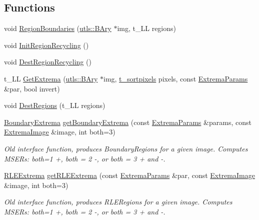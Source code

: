 \subsection*{Functions}
\begin{CompactItemize}
\item 
void \hyperlink{namespaceextrema_a95ae7aa3f47be9a16b8c0c503fd7e79}{Region\-Boundaries} (\hyperlink{structutls_1_1Ary}{utls::BAry} $\ast$img, t\_\-LL regions)
\item 
void \hyperlink{namespaceextrema_8325736376fa1836b6819f542de6274a}{Init\-Region\-Recycling} ()
\item 
void \hyperlink{namespaceextrema_2ebf6ba956eabc1f5c60cddf60af40ef}{Dest\-Region\-Recycling} ()
\item 
t\_\-LL \hyperlink{namespaceextrema_6fa06d87bc447f8bb199c9ad11bb1448}{Get\-Extrema} (\hyperlink{structutls_1_1Ary}{utls::BAry} $\ast$img, \hyperlink{structextrema_1_1s__sortpixels}{t\_\-sortpixels} pixels, const \hyperlink{structextrema_1_1ExtremaParams}{Extrema\-Params} \&par, bool invert)
\item 
void \hyperlink{namespaceextrema_1ddc04cbc97430b6127e80eba26a0fb0}{Dest\-Regions} (t\_\-LL regions)
\item 
\hyperlink{structextrema_1_1BoundaryExtrema}{Boundary\-Extrema} \hyperlink{namespaceextrema_6287a927a289e58f10e7cf51a2420839}{get\-Boundary\-Extrema} (const \hyperlink{structextrema_1_1ExtremaParams}{Extrema\-Params} \&params, const \hyperlink{structextrema_1_1ExtremaImage}{Extrema\-Image} \&image, int both=3)
\begin{CompactList}\small\item\em Old interface function, produces Boundary\-Regions for a given image. Computes MSERs: both=1 +, both = 2 -, or both = 3 + and -. \item\end{CompactList}\item 
\hyperlink{structextrema_1_1RLEExtrema}{RLEExtrema} \hyperlink{namespaceextrema_6898d264cefada5cdda1486f1b58b97e}{get\-RLEExtrema} (const \hyperlink{structextrema_1_1ExtremaParams}{Extrema\-Params} \&par, const \hyperlink{structextrema_1_1ExtremaImage}{Extrema\-Image} \&image, int both=3)
\begin{CompactList}\small\item\em Old interface function, produces RLERegions for a given image. Computes MSERs: both=1 +, both = 2 -, or both = 3 + and -. \item\end{CompactList}\item 

\end{CompactItemize}
